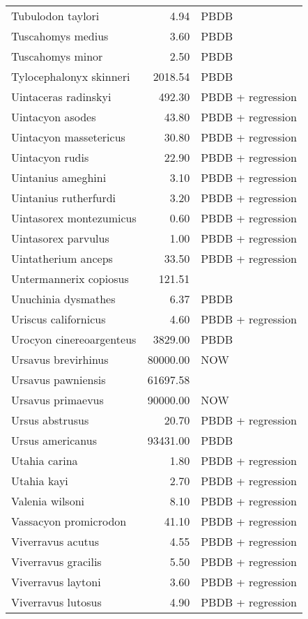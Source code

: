 \begin{table}[ht]
\begin{tabular}{lrl}
  Tubulodon taylori & 4.94 & PBDB \\ 
  Tuscahomys medius & 3.60 & PBDB \\ 
  Tuscahomys minor & 2.50 & PBDB \\ 
  Tylocephalonyx skinneri & 2018.54 & PBDB \\ 
  Uintaceras radinskyi & 492.30 & PBDB + regression \\ 
  Uintacyon asodes & 43.80 & PBDB + regression \\ 
  Uintacyon massetericus & 30.80 & PBDB + regression \\ 
  Uintacyon rudis & 22.90 & PBDB + regression \\ 
  Uintanius ameghini & 3.10 & PBDB + regression \\ 
  Uintanius rutherfurdi & 3.20 & PBDB + regression \\ 
  Uintasorex montezumicus & 0.60 & PBDB + regression \\ 
  Uintasorex parvulus & 1.00 & PBDB + regression \\ 
  Uintatherium anceps & 33.50 & PBDB + regression \\ 
  Untermannerix copiosus & 121.51 & \cite{Tomiya2013} \\ 
  Unuchinia dysmathes & 6.37 & PBDB \\ 
  Uriscus californicus & 4.60 & PBDB + regression \\ 
  Urocyon cinereoargenteus & 3829.00 & PBDB \\ 
  Ursavus brevirhinus & 80000.00 & NOW \\ 
  Ursavus pawniensis & 61697.58 & \cite{Tomiya2013} \\ 
  Ursavus primaevus & 90000.00 & NOW \\ 
  Ursus abstrusus & 20.70 & PBDB + regression \\ 
  Ursus americanus & 93431.00 & PBDB \\ 
  Utahia carina & 1.80 & PBDB + regression \\ 
  Utahia kayi & 2.70 & PBDB + regression \\ 
  Valenia wilsoni & 8.10 & PBDB + regression \\ 
  Vassacyon promicrodon & 41.10 & PBDB + regression \\ 
  Viverravus acutus & 4.55 & PBDB + regression \\ 
  Viverravus gracilis & 5.50 & PBDB + regression \\ 
  Viverravus laytoni & 3.60 & PBDB + regression \\ 
  Viverravus lutosus & 4.90 & PBDB + regression \\ 

\end{tabular}
\end{table}
